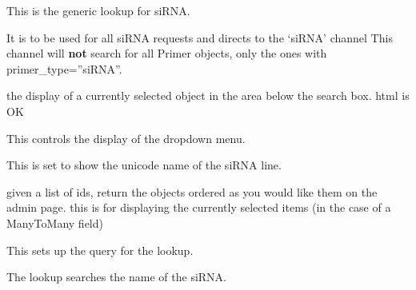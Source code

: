 \documentclass[letterpaper,10pt,english]{sphinxmanual}
\begin{document}

\begin{fulllineitems}
\label{api:experimentdb.reagents.lookups.SiRNALookup}
This is the generic lookup for siRNA.


It is to be used for all siRNA requests and directs to the `siRNA' channel
This channel will \textbf{not} search for all Primer objects, only the ones with primer\_type=''siRNA''.


\begin{fulllineitems}
\label{api:experimentdb.reagents.lookups.SiRNALookup.format_item}
the display of a currently selected object in the area below the search box. html is OK


\end{fulllineitems}


\begin{fulllineitems}
\label{api:experimentdb.reagents.lookups.SiRNALookup.format_result}
This controls the display of the dropdown menu.


This is set to show the unicode name of the siRNA line.


\end{fulllineitems}


\begin{fulllineitems}
\label{api:experimentdb.reagents.lookups.SiRNALookup.get_objects}
given a list of ids, return the objects ordered as you would like them on the admin page.
this is for displaying the currently selected items (in the case of a ManyToMany field)


\end{fulllineitems}


\begin{fulllineitems}
\label{api:experimentdb.reagents.lookups.SiRNALookup.get_query}
This sets up the query for the lookup.


The lookup searches the name of the siRNA.


\end{fulllineitems}


\end{fulllineitems}
\end{document}
